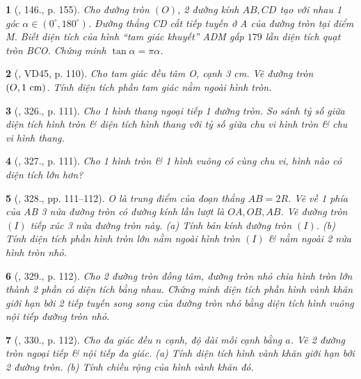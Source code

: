 \documentclass{article}
\newtheorem{baitoan}{}
\begin{document}
\begin{baitoan}[\cite{Tuyen_Toan_9_old}, 146., p. 155]
	Cho đường tròn $(O)$, 2 đường kính $AB,CD$ tạo với nhau 1 góc $\alpha\in(0^\circ,180^\circ)$. Đường thẳng CD cắt tiếp tuyến ở A của đường tròn tại điểm M. Biết diện tích của hình ``tam giác khuyết'' ADM gấp $179$ lần diện tích quạt tròn BCO. Chứng minh $\tan\alpha = \pi\alpha$.
\end{baitoan}

\begin{baitoan}[\cite{Binh_Toan_9_tap_2}, VD45, p. 110]
	Cho tam giác đều tâm O, cạnh {\rm3 cm}. Vẽ đường tròn $(O,1\ {\rm cm})$. Tính diện tích phần tam giác nằm ngoài hình tròn.
\end{baitoan}

\begin{baitoan}[\cite{Binh_Toan_9_tap_2}, 326., p. 111]
	Cho 1 hình thang ngoại tiếp 1 đường tròn. So sánh tỷ số giữa diện tích hình tròn \& diện tích hình thang với tỷ số giữa chu vi hình tròn \& chu vi hình thang.
\end{baitoan}

\begin{baitoan}[\cite{Binh_Toan_9_tap_2}, 327., p. 111]
	Cho 1 hình tròn \& 1 hình vuông có cùng chu vi, hình nào có diện tích lớn hơn?
\end{baitoan}

\begin{baitoan}[\cite{Binh_Toan_9_tap_2}, 328., pp. 111--112]
	O là trung điểm của đoạn thẳng $AB = 2R$. Vẽ về 1 phía của AB 3 nửa đường tròn có đường kính lần lượt là $OA,OB,AB$. Vẽ đường tròn $(I)$ tiếp xúc 3 nửa đường tròn này. (a) Tính bán kính đường tròn $(I)$. (b) Tính diện tích phần hình tròn lớn nằm ngoài hình tròn $(I)$ \& nằm ngoài 2 nửa hình tròn nhỏ.
\end{baitoan}

\begin{baitoan}[\cite{Binh_Toan_9_tap_2}, 329., p. 112]
	Cho 2 đường tròn đồng tâm, đường tròn nhỏ chia hình tròn lớn thành 2 phần có diện tích bằng nhau. Chứng minh diện tích phần hình vành khăn giới hạn bởi 2 tiếp tuyến song song của đường tròn nhỏ bằng diện tích hình vuông nội tiếp đường tròn nhỏ.
\end{baitoan}

\begin{baitoan}[\cite{Binh_Toan_9_tap_2}, 330., p. 112]
	Cho đa giác đều $n$ cạnh, độ dài mỗi cạnh bằng $a$. Vẽ 2 đường tròn ngoại tiếp \& nội tiếp đa giác. (a) Tính diện tích hình vành khăn giới hạn bởi 2 đường tròn. (b) Tính chiều rộng của hình vành khăn đó.
\end{baitoan}
\end{document}
